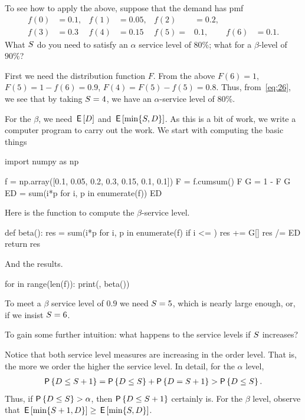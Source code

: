\begin{exercise}
To see how to apply the above, suppose that the demand has pmf
\begin{align*}
 f(0)&=0.1, &f(1)&=0.05, &f(2)&=0.2, \\
f(3) &= 0.3 & f(4) &= 0.15 & f(5)=& 0.1, &f(6)&=0.1.
\end{align*}
What $S$ do you need to satisfy an $\alpha$ service level of 80\%; what for a $\beta$-level of $90\%$?
\begin{solution}
First we need the distribution function $F$. From the above
$F(6)=1$, $F(5)=1-f(6) = 0.9$, $F(4)=F(5)-f(5) = 0.8$. Thus, from~\eqref{eq:26}, we see that by taking $S=4$, we have an $\alpha$-service level of 80\%.

For the $\beta$, we need $\,\mathsf{E}\left[D\right]$ and $\,\mathsf{E}\left[\min\{S, D\}\right]$. As this is a bit of work, we write a computer program to carry out the work. We start with computing the basic things
\begin{pyconsole} 
import numpy as np

f = np.array([0.1, 0.05, 0.2, 0.3, 0.15, 0.1, 0.1])
F = f.cumsum()
F
G = 1 - F
G
ED = sum(i*p for i, p in enumerate(f))
ED
\end{pyconsole}

Here is the function to compute the $\beta$-service level.
\begin{pyconsole}
def beta(\Q):
    res = sum(i*p for i, p in enumerate(f) if i <= \Q)
    res += \Q*G[\Q]
    res /= ED
    return res
    
\end{pyconsole}
And the results.
\begin{pyconsole}
for \Q in range(len(f)):
    print(\Q, beta(\Q))
    
\end{pyconsole}
To meet a $\beta$ service level of $0.9$ we need  $S=5$, which is nearly large enough, or, if we insist $S=6$. 
\end{solution}
\end{exercise}

\begin{exercise}
To gain some further intuition:  what happens to the service levels if $S$ increases?
  \begin{solution}
Notice that both service level measures are increasing in the order level. That is, the more we order the higher the service level. In detail, for the $\alpha$ level,
\begin{align*}
  \P{D\leq \Q+1} = \P{D\leq \Q} + \P{D=\Q+1} > \P{D \leq \Q}.
\end{align*}
Thus, if $\P{D\leq \Q} > \alpha$, then $\P{D\leq \Q+1}$ certainly is. For the $\beta$ level, observe that $\,\mathsf{E}\left[\min\{S+1, D\}\right] \geq \,\mathsf{E}\left[\min\{S, D\}\right]$. 
  \end{solution}
\end{exercise}

